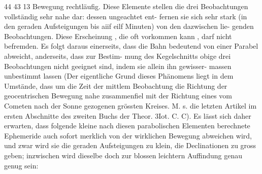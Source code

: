 \documentclass[12pt,a4paper]{article}
\begin{document}
44    43     13 
Bewegung  rechtläufig. 
Diese  Elemente  stellen  die  drei  Beobachtungen  vollständig  sehr  nahe  dar:  dessen  ungeachtet  ent- 
fernen sie  sich  sehr  stark  (in  den  geraden  Aufsteigungen  bis  aiif  eilf  Minuten)  von  den  dazwischen  lie- 
genden Beobachtungen.  Diese  Erscheinung ,  die  oft  vorkommen  kann ,  darf  nicht  befremden.  Es  folgt 
daraus  einerseits,  dass  die  Bahn  bedeutend  von  einer  Parabel  abweicht,  anderseits,  dass  zur  Bestim- 
mung des  Kegelschnitts  obige  drei  Beobachtungen  nicht  geeignet  sind,  indem  sie  allein  ihn  gewisser- 
massen  unbestimmt  lassen  (Der  eigentliche  Grund  dieses  Phänomens  liegt  in  dem  Umstände,  dass  um 
die  Zeit  der  mittlem  Beobachtung  die  Richtung  der  geocentrischen  Bewegung  nahe  zusammenfiel  mit 
der  Richtung  eines  vom  Cometen  nach  der  Sonne  gezogenen  grössten  Kreises.  M.  s.  die  letzten  Artikel 
im  ersten  Abschnitte  des  zweiten  Buchs  der  Theor.  3Iot.  C.  C).  Es  lässt  sich  daher  erwarten,  dass 
folgende  kleine  nach  diesen  parabolischen  Elementen  berechnete  Ephemeride  auch  sofort  merklich  von 
der  wirklichen  Bewegung  abweichen  wird,  und  zwar  wird  sie  die  geraden  Aufsteigungen  zu  klein,  die 
Declinationen  zu  gross  geben;  inzwischen  wird  dieselbe  doch  zur  blossen  leichtern  Auffindung  genau 
genug  sein: 


\newpage
\end{document}
